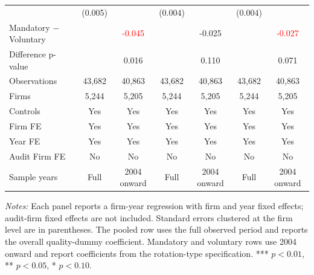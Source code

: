 \begin{table}[htbp]
\begin{threeparttable}
{\begin{tabular}{l cc cc cc}
 & (0.005) &  & (0.004) &  & (0.004) &  \\
Mandatory $-$ Voluntary &  & \textcolor{red}{-0.045\sym{**}} &  & -0.025 &  & \textcolor{red}{-0.027\sym{*}} \\
Difference p-value &  & 0.016 &  & 0.110 &  & 0.071 \\
Observations & 43,682 & 40,863 & 43,682 & 40,863 & 43,682 & 40,863 \\
Firms & 5,244 & 5,205 & 5,244 & 5,205 & 5,244 & 5,205 \\
\midrule
Controls & Yes & Yes & Yes & Yes & Yes & Yes \\
Firm FE & Yes & Yes & Yes & Yes & Yes & Yes \\
Year FE & Yes & Yes & Yes & Yes & Yes & Yes \\
Audit Firm FE & No & No & No & No & No & No \\
Sample years & Full & 2004 onward & Full & 2004 onward & Full & 2004 onward \\
\bottomrule
\end{tabular}}
\begin{tablenotes}\footnotesize
\item \textit{Notes:} Each panel reports a firm-year regression with firm and year fixed effects; audit-firm fixed effects are not included. Standard errors clustered at the firm level are in parentheses. The pooled row uses the full observed period and reports the overall quality-dummy coefficient. Mandatory and voluntary rows use 2004 onward and report coefficients from the rotation-type specification. *** \(p<0.01\), ** \(p<0.05\), * \(p<0.10\).
\end{tablenotes}
\end{threeparttable}
\end{table}
